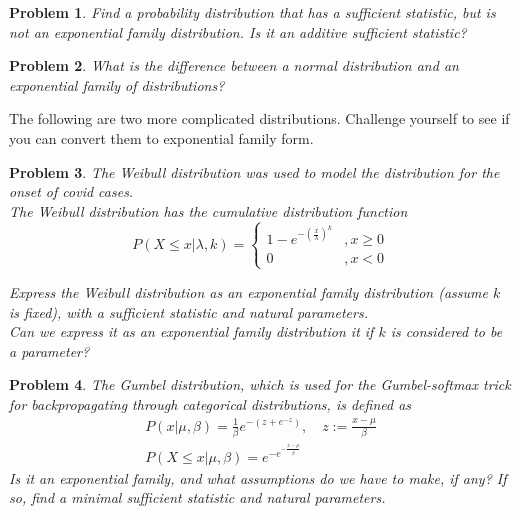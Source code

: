 \documentclass[a4paper]{article}
\newtheorem{problem}{Problem}[section]
\begin{document}
\begin{problem} 
Find a probability distribution that has a sufficient statistic, but is not an exponential family distribution.  Is it an additive sufficient statistic?
\end{problem}

\begin{problem}
  What is the difference between a normal distribution and an exponential family of distributions?
\end{problem}

The following are two more complicated distributions.  Challenge yourself to see if you can convert them to exponential family form.

\begin{problem}
  The Weibull distribution was used to model the distribution for the onset of covid cases.  \\
  The Weibull distribution has the cumulative distribution function
  \begin{equation}
    P( X \leq x \vert \lambda, k ) = \begin{cases}
      1-e^{-\left( \frac{x}{\lambda} \right)^k} &, x \geq 0 \\
      0 &, x <0
    \end{cases}
    \label{}
  \end{equation}

Express the Weibull distribution as an exponential family distribution (assume $k$ is fixed), with a sufficient statistic and natural parameters.  \\
Can we express it as an exponential family distribution it if $k$ is considered to be a parameter?
\end{problem}

\begin{problem}
  The Gumbel distribution, which is used for the Gumbel-softmax trick for backpropagating through categorical distributions, is defined as
  \begin{equation}
    \begin{split}
      P( x \vert \mu, \beta ) = \frac{1}{\beta} e^{-(z+e^{-z})}, \quad z:= \frac{x-\mu}{\beta} \\
      P( X \leq x \vert \mu, \beta ) = e^{-e^{-\frac{x-\mu}{\beta}} }
    \end{split}
    \label{Gumbel}
  \end{equation}
Is it an exponential family, and what assumptions do we have to make, if any?  If so, find a minimal sufficient statistic and natural parameters.
\end{problem}
\end{document}
